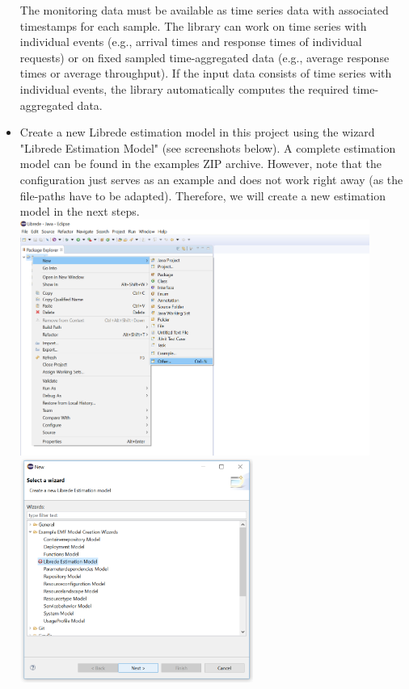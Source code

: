 \begin{itemize}
			The monitoring data must be available as time series data with associated timestamps for each sample. The library can work on time series with individual events (e.g., arrival times and response times of individual requests) or on fixed sampled time-aggregated data (e.g., average response times or average throughput). If the input data consists of time series with individual events, the library automatically computes the required time-aggregated data. 
	\item Create a new Librede estimation model in this project using the wizard "Librede Estimation Model" (see screenshots below). A complete estimation model can be found in the examples ZIP archive. However, note that the configuration just serves as an example and does not work right away (as the file-paths have to be adapted). Therefore, we will create a new estimation model in the next steps. \newline
				\newline
				\includegraphics[width=0.9\textwidth]{screenshots/Screenshot11} \newline
				\newline
				\includegraphics[width=0.6\textwidth]{screenshots/Screenshot12}			

\end{itemize}
